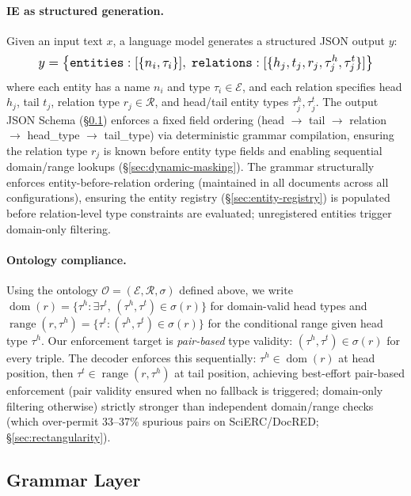 \paragraph{IE as structured generation.}
Given an input text $x$, a language model generates a structured JSON output $y$:
%
\begin{equation}\label{eq:output-schema}
\resizebox{.88\columnwidth}{!}{$\displaystyle
  y = \bigl\{\texttt{entities}: [\{n_i, \tau_i\}],\; \texttt{relations}: [\{h_j, t_j, r_j, \tau^h_j, \tau^t_j\}]\bigr\}
$}
\end{equation}
%
where each entity has a name $n_i$ and type $\tau_i \in \mathcal{E}$, and each relation specifies head $h_j$, tail $t_j$, relation type $r_j \in \mathcal{R}$, and head/tail entity types $\tau^h_j, \tau^t_j$.
The output JSON Schema (\S\ref{sec:grammar}) enforces a fixed field ordering (head $\to$ tail $\to$ relation $\to$ head\_type $\to$ tail\_type) via deterministic grammar compilation, ensuring the relation type $r_j$ is known before entity type fields and enabling sequential domain/range lookups (\S\ref{sec:dynamic-masking}).
The grammar structurally enforces entity-before-relation ordering (maintained in all documents across all configurations), ensuring the entity registry (\S\ref{sec:entity-registry}) is populated before relation-level type constraints are evaluated; unregistered entities trigger domain-only filtering.

\paragraph{Ontology compliance.}
Using the ontology $\mathcal{O} = (\mathcal{E}, \mathcal{R}, \sigma)$ defined above, we write $\operatorname{dom}(r) = \{\tau^h : \exists \tau^t,\, (\tau^h, \tau^t) \in \sigma(r)\}$ for domain-valid head types and $\operatorname{range}(r, \tau^h) = \{\tau^t : (\tau^h, \tau^t) \in \sigma(r)\}$ for the conditional range given head type $\tau^h$.
Our enforcement target is \emph{pair-based} type validity: $(\tau^h, \tau^t) \in \sigma(r)$ for every triple.
The decoder enforces this sequentially: $\tau^h \in \operatorname{dom}(r)$ at head position, then $\tau^t \in \operatorname{range}(r, \tau^h)$ at tail position, achieving best-effort pair-based enforcement (pair validity ensured when no fallback is triggered; domain-only filtering otherwise) strictly stronger than independent domain/range checks (which over-permit 33--37\% spurious pairs on SciERC/DocRED; \S\ref{sec:rectangularity}).


\subsection{Grammar Layer}
\label{sec:grammar}

